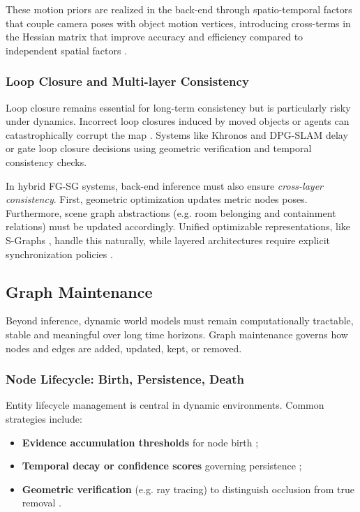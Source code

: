 These motion priors are realized in the back-end through spatio-temporal factors that couple camera poses with object motion vertices, introducing cross-terms in the Hessian matrix that improve accuracy and efficiency compared to independent spatial factors \cite{zhang_semantic-integrated_2026}.

\subsubsection{Loop Closure and Multi-layer Consistency}
Loop closure remains essential for long-term consistency but is particularly risky under dynamics. 
Incorrect loop closures induced by moved objects or agents can catastrophically corrupt the map \cite{giberna_dynemo-slam_2025}.
Systems like Khronos \cite{schmid_khronos_2024} and DPG-SLAM \cite{walcott-bryant_dynamic_2012} delay or gate loop closure decisions using geometric verification and temporal consistency checks.

In hybrid FG-SG systems, back-end inference must also ensure \textit{cross-layer consistency}. 
First, geometric optimization updates metric nodes poses. 
Furthermore, scene graph abstractions (e.g. room belonging and containment relations) must be updated accordingly. 
Unified optimizable representations, like S-Graphs \cite{bavle_s-graphs_2025}, handle this naturally, while layered architectures require explicit synchronization policies \cite{hughes_hydra_2022} \cite{rosinol_kimera_2021}.

\subsection{Graph Maintenance}\label{sec:construction_pipeline_graph_maintenance}
Beyond inference, dynamic world models must remain computationally tractable, stable and meaningful over long time horizons. 
Graph maintenance governs how nodes and edges are added, updated, kept, or removed.

\subsubsection{Node Lifecycle: Birth, Persistence, Death}
Entity lifecycle management is central in dynamic environments. 
Common strategies include:
\begin{itemize}
    \item \textbf{Evidence accumulation thresholds} for node birth \cite{schmid_khronos_2024};
    \item \textbf{Temporal decay or confidence scores} governing persistence \cite{gomez_object-based_2020};
    \item \textbf{Geometric verification} (e.g. ray tracing) to distinguish occlusion from true removal \cite{schmid_khronos_2024}.
\end{itemize}


